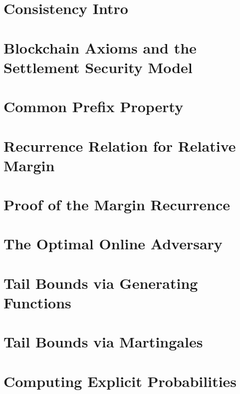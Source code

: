 \chapter{Consistency Intro}\label{ch:cons-intro}


\chapter{Blockchain Axioms and the Settlement Security Model}\label{sec:model}

\label{sec:definitions}

\chapter{Common Prefix Property}\label{sec:cp-forks}


\chapter{Recurrence Relation for Relative Margin}\label{sec:recursion}


\chapter{Proof of the Margin Recurrence}\label{sec:margin-proof}


\chapter{The Optimal Online Adversary}\label{sec:canonical-forks}


\chapter{Tail Bounds via Generating Functions}\label{sec:estimates}


\chapter{Tail Bounds via Martingales}\label{sec:martingale-proof}


\chapter{Computing Explicit Probabilities}\label{sec:exact-prob}

